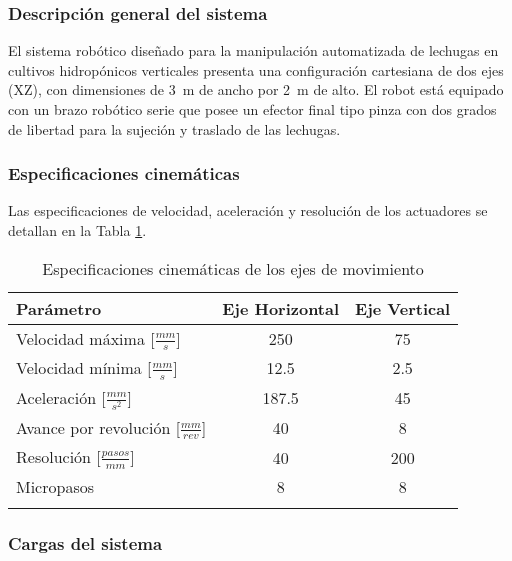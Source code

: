 
\subsubsection{Descripción general del sistema}

El sistema robótico diseñado para la manipulación automatizada de lechugas en cultivos hidropónicos verticales presenta una configuración cartesiana de dos ejes (XZ), con dimensiones de 3~m de ancho por 2~m de alto. El robot está equipado con un brazo robótico serie que posee un efector final tipo pinza con dos grados de libertad para la sujeción y traslado de las lechugas.

\subsubsection{Especificaciones cinemáticas}

Las especificaciones de velocidad, aceleración y resolución de los actuadores se detallan en la Tabla \ref{tab:esp_cinematicas}.

\begin{table}[htbp]
\centering
\label{tab:esp_cinematicas}
\begin{tabular}{|l|c|c|}
\hline
\textbf{Parámetro} & \textbf{Eje Horizontal} & \textbf{Eje Vertical} \\ \hline
Velocidad máxima [\(\frac{mm}{s}\)] & 250 & 75 \\ \hline
Velocidad mínima [\(\frac{mm}{s}\)] & 12.5 & 2.5 \\ \hline
Aceleración [\(\frac{mm}{s^2}\)] & 187.5 & 45 \\ \hline
Avance por revolución [\(\frac{mm}{rev}\)] & 40 & 8 \\ \hline
Resolución [\(\frac{pasos}{mm}\)] & 40 & 200 \\ \hline
Micropasos & 8 & 8 \\ \hline
\multicolumn{3}{c}{} \\
\end{tabular}
\caption{Especificaciones cinemáticas de los ejes de movimiento}
\end{table}

\subsubsection{Cargas del sistema}

